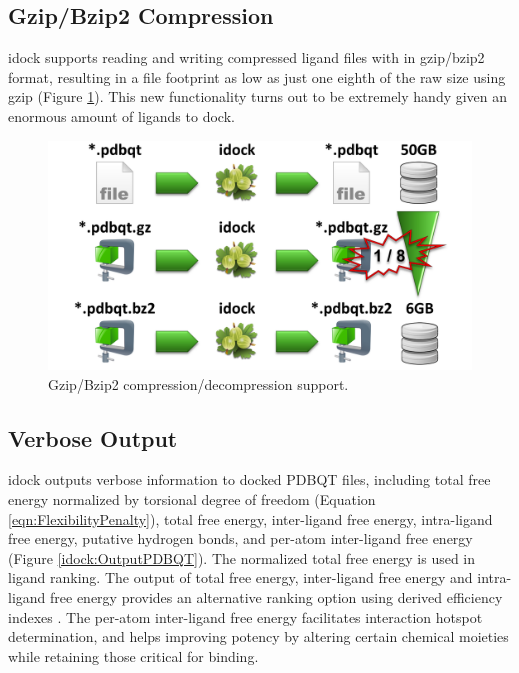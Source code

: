 \subsection{Gzip/Bzip2 Compression}

idock supports reading and writing compressed ligand files with in gzip/bzip2 format, resulting in a file footprint as low as just one eighth of the raw size using gzip (Figure \ref{idock:Compression}). This new functionality turns out to be extremely handy given an enormous amount of ligands to dock.

\begin{figure}
\centering
\includegraphics[width=\linewidth]{idock/Compression.png}
\caption{Gzip/Bzip2 compression/decompression support.}
\label{idock:Compression}
\end{figure}

\subsection{Verbose Output}

idock outputs verbose information to docked PDBQT files, including total free energy normalized by torsional degree of freedom (Equation \eqref{eqn:FlexibilityPenalty}), total free energy, inter-ligand free energy, intra-ligand free energy, putative hydrogen bonds, and per-atom inter-ligand free energy (Figure \ref{idock:OutputPDBQT}). The normalized total free energy is used in ligand ranking. The output of total free energy, inter-ligand free energy and intra-ligand free energy provides an alternative ranking option using derived efficiency indexes \citep{335,336,337}. The per-atom inter-ligand free energy facilitates interaction hotspot determination, and helps improving potency by altering certain chemical moieties while retaining those critical for binding.

